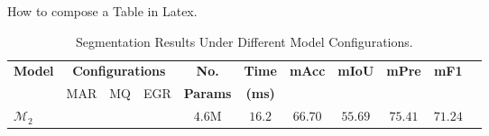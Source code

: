 \documentclass[conference]{IEEEtran}
\newcommand{\cmark}{\ding{51}}
\newcommand{\xmark}{\ding{55}}
\begin{document}
How to compose a Table in Latex.
\begin{table}[!t]
\footnotesize
\setlength{\tabcolsep}{2.4pt}
\renewcommand{\arraystretch}{1.2}
\centering
\caption{Segmentation Results Under Different Model Configurations.}
\begin{tabular}{lcccccccccc}
\hline
\multirow{2}{*}{\textbf{Model}} & \multicolumn{3}{c}{\textbf{Configurations}}         &    \textbf{No.} &    \textbf{Time}     & \multirow{2}{*}{\textbf{mAcc}}  & \multirow{2}{*}{\textbf{mIoU}}  & \multirow{2}{*}{\textbf{mPre}}    & \multirow{2}{*}{\textbf{mF1}}   \\ 
& MAR &  MQ & EGR & \textbf{Params}  & \textbf{(ms)} &  &  &  &   \\
\hline
$\mathcal{M}_2$ & \cmark & \xmark &  \xmark   &	$4.6$M	&  $16.2$	 & $66.70$ &	$55.69$ &	$75.41$	& $71.24$	 \\

\hline
\end{tabular}
\label{tab_ablationStudy}
\end{table}
\end{document}
